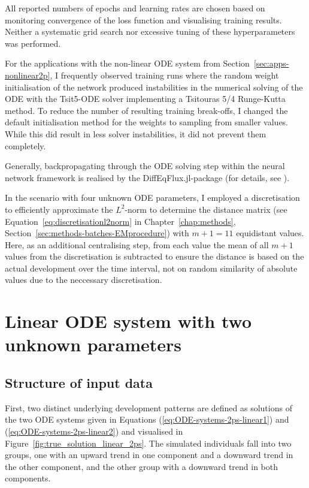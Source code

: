 All reported numbers of epochs and learning rates are chosen based on monitoring convergence of the loss function and visualising training results. Neither a systematic grid search nor excessive tuning of these hyperparameters was performed.

For the applications with the non-linear ODE system from Section~\ref{sec:apps-nonlinear2p}, I frequently observed training runs where the random weight initialisation of the network produced instabilities in the numerical solving of the ODE with the Tsit5-ODE solver implementing a Tsitouras 5/4 Runge-Kutta method. To reduce the number of resulting training break-offs, I changed the default initialisation method for the weights to sampling from smaller values. While this did result in less solver instabilities, it did not prevent them completely.

Generally, backpropagating through the ODE solving step within the neural network framework is realised by the DiffEqFlux.jl-package (for details, see \cite{Rackauckas2019}). 

In the scenario with four unknown ODE parameters, I employed a discretisation to efficiently approximate the $L^2$-norm to determine the distance matrix (see Equation~\ref{eq:discretisationl2norm} in Chapter~\ref{chap:methods}, Section~\ref{sec:methods-batches-EMprocedure}) with $m+1=11$ equidistant values. Here, as an additional centralising step, from each value the mean of all $m+1$ values from the discretisation is subtracted to ensure the distance is based on the actual development over the time interval, not on random similarity of absolute values due to the neccessary discretisation.

\section{Linear ODE system with two unknown parameters}\label{sec:apps-linear2p}

\subsection{Structure of input data}\label{sec:apps-linear2p-inputdata}

First, two distinct underlying development patterns are defined as solutions of the two ODE systems given in Equations (\ref{eq:ODE-systems-2ps-linear1}) and (\ref{eq:ODE-systems-2ps-linear2}) and visualised in Figure~\ref{fig:true_solution_linear_2ps}. The simulated individuals fall into two groups, one with an upward trend in one component and a downward trend in the other component, and the other group with a downward trend in both components. 

